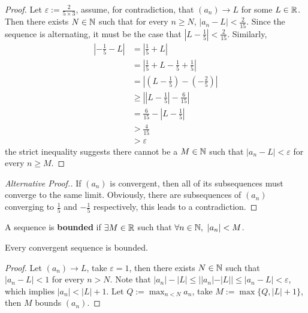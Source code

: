 \documentclass[11pt]{article}
\begin{document}
	\begin{proof}
		Let $\varepsilon := \frac{2}{5 \times 3}$, assume, for contradiction, that $(a_n) \to L$ for some $L \in \mathbb{R}$. Then there exists $N \in \mathbb{N}$ such that for every $n \geq N$, $|a_n - L| < \frac{2}{15}$. Since the sequence is alternating, it must be the case that $\left|L - \frac{1}{5} \right| < \frac{2}{15}$. Similarly, 
		\begin{align}
			\left| - \frac{1}{5} - L\right| &= \left|\frac{1}{5} + L \right|\\
			&= \left|\frac{1}{5} + L - \frac{1}{5} + \frac{1}{5} \right| \\
			&= \left|(L - \frac{1}{5}) - (- \frac{2}{5})\right| \\
			&\geq \left | \left | L - \frac{1}{5} \right | - \frac{6}{15} \right|\\
			&= \frac{6}{15} - \left|L - \frac{1}{5}\right| \\
			&> \frac{4}{15} \\
			&> \varepsilon
		\end{align}
		the strict inequality suggests there cannot be a $M \in \mathbb{N}$ such that $|a_n - L| < \varepsilon$ for every $n \geq M$.
	\end{proof}
	
	\begin{proof}[Alternative Proof.]
		If $(a_n)$ is convergent, then all of its subsequences must converge to the same limit. Obviously, there are subsequences of $(a_n)$ converging to $\frac{1}{5}$ and $-\frac{1}{5}$ respectively, this leads to a contradiction.
	\end{proof}
	
	\begin{definition}
		A sequence is \textbf{bounded} if $\exists M \in \mathbb{R}$ such that $\forall n \in \mathbb{N},\ |a_n| < M$.
	\end{definition}
	
	\begin{theorem}
		Every convergent sequence is bounded.
	\end{theorem}
	
	\begin{proof}
		Let $(a_n) \to L$, take $\varepsilon = 1$, then there exists $N \in \mathbb{N}$ such that $|a_n - L| < 1$ for every $n > N$. Note that $|a_n| - |L| \leq ||a_n| - |L|| \leq |a_n - L| < \varepsilon$, which implies $|a_n| < |L| + 1$. Let $Q := \max_{n < N} a_n$, take $M := \max\{Q, |L| + 1\}$, then $M$ bounds $(a_n)$.
	\end{proof}
\end{document}
